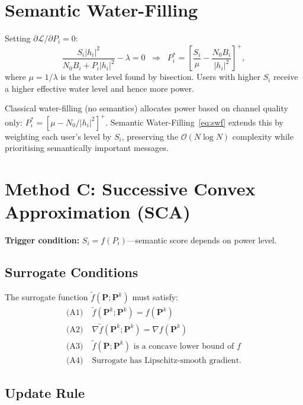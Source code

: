 \documentclass[conference]{IEEEtran}
\begin{document}
\section{Semantic Water-Filling}
\label{sec:waterfilling}

Setting $\partial\mathcal{L}/\partial P_i = 0$:
\begin{equation}
\frac{S_i |h_i|^2}{N_0 B_i + P_i |h_i|^2} - \lambda = 0
\;\;\Rightarrow\;\;
P_i^* = \left[\frac{S_i}{\mu} - \frac{N_0 B_i}{|h_i|^2}\right]^+,
\label{eq:swf}
\end{equation}
where $\mu = 1/\lambda$ is the water level found by bisection. Users with higher $S_i$ receive a higher effective water level and hence more power.

Classical water-filling (no semantics) allocates power based on channel quality only:
$P_i^* = [\mu - N_0/|h_i|^2]^+$.
Semantic Water-Filling~\eqref{eq:swf} extends this by weighting each user's level by $S_i$, preserving the $\mathcal{O}(N\log N)$ complexity while prioritising semantically important messages.

\section{Method C: Successive Convex Approximation (SCA)}
\label{sec:sca}

\textbf{Trigger condition:} $S_i = f(P_i)$---semantic score depends on power level.

\subsection{Surrogate Conditions}

The surrogate function $\tilde{f}(\mathbf{P};\mathbf{P}^k)$ must satisfy:
\begin{align}
\text{(A1)}\;&\tilde{f}(\mathbf{P}^k;\mathbf{P}^k) = f(\mathbf{P}^k)\\
\text{(A2)}\;&\nabla\tilde{f}(\mathbf{P}^k;\mathbf{P}^k) = \nabla f(\mathbf{P}^k)\\
\text{(A3)}\;&\tilde{f}(\mathbf{P};\mathbf{P}^k) \text{ is a concave lower bound of } f\\
\text{(A4)}\;&\text{Surrogate has Lipschitz-smooth gradient.}
\end{align}

\subsection{Update Rule}
\end{document}
